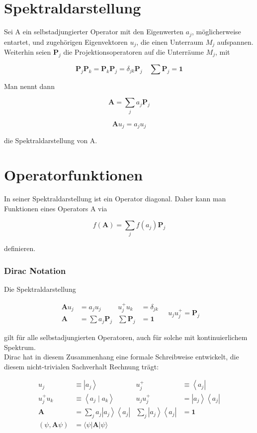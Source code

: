 \documentclass[10pt, letterpaper]{article}
\begin{document}
\section*{Spektraldarstellung}
Sei A ein selbstadjungierter Operator mit den Eigenwerten $a_{j}$, möglicherweise entartet, und zugehörigen Eigenvektoren $u_{j}$, die einen Unterraum $M_{j}$ aufspannen. Weiterhin seien $\mathbf{P}_{j}$ die Projektionsoperatoren auf die Unterräume $M_{j}$, mit

$$
\mathbf{P}_{j} \mathbf{P}_{k}=\mathbf{P}_{k} \mathbf{P}_{j}=\delta_{j k} \mathbf{P}_{j} \quad \sum \mathbf{P}_{j}=\mathbf{1}
$$

Man nennt dann

$$
\mathbf{A}=\sum_{j} a_{j} \mathbf{P}_{j}
$$

$$
\mathbf{A} u_{j}=a_{j} u_{j}
$$

die Spektraldarstellung von A.

\section*{Operatorfunktionen}
In seiner Spektraldarstellung ist ein Operator diagonal. Daher kann man Funktionen eines Operators A via

$$
f(\mathbf{A})=\sum_{j} f\left(a_{j}\right) \mathbf{P}_{j}
$$

definieren.

\subsubsection*{Dirac Notation}
Die Spektraldarstellung

$$
\begin{aligned}
\mathbf{A} u_{j} & =a_{j} u_{j} & u_{j}^{+} u_{k} & =\delta_{j k} \\
\mathbf{A} & =\sum a_{j} \mathbf{P}_{j} & \sum \mathbf{P}_{j} & =\mathbf{1}
\end{aligned} \quad u_{j} u_{j}^{+}=\mathbf{P}_{j}
$$

gilt für alle selbstadjungierten Operatoren, auch für solche mit kontinuierlichem Spektrum.\\
Dirac hat in diesem Zusammenhang eine formale Schreibweise entwickelt, die diesem nicht-trivialen Sachverhalt Rechnung trägt:

$$
\begin{aligned}
u_{j} & \equiv\left|a_{j}\right\rangle & u_{j}^{+} & \equiv\left\langle a_{j}\right| \\
u_{j}^{+} u_{k} & \equiv\left\langle a_{j} \mid a_{k}\right\rangle & u_{j} u_{j}^{+} & =\left|a_{j}\right\rangle\left\langle a_{j}\right| \\
\mathbf{A} & =\sum_{j} a_{j}\left|a_{j}\right\rangle\left\langle a_{j}\right| & \sum_{j}\left|a_{j}\right\rangle\left\langle a_{j}\right| & =\mathbf{1} \\
(\psi, \mathbf{A} \psi) & =\langle\psi| \mathbf{A}|\psi\rangle & &
\end{aligned}
$$
\end{document}
